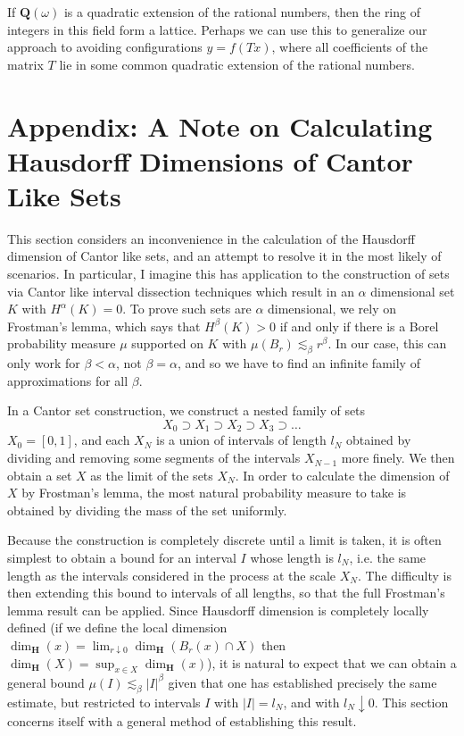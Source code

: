 \documentclass{report}
\theoremstyle{plain}
\theoremstyle{plain}
\begin{document}
If $\mathbf{Q}(\omega)$ is a quadratic extension of the rational numbers, then the ring of integers in this field form a lattice. Perhaps we can use this to generalize our approach to avoiding configurations $y = f(Tx)$, where all coefficients of the matrix $T$ lie in some common quadratic extension of the rational numbers.

\chapter{Appendix: A Note on Calculating Hausdorff Dimensions of Cantor Like Sets}

This section considers an inconvenience in the calculation of the Hausdorff dimension of Cantor like sets, and an attempt to resolve it in the most likely of scenarios. In particular, I imagine this has application to the construction of sets via Cantor like interval dissection techniques which result in an $\alpha$ dimensional set $K$ with $H^\alpha(K) = 0$. To prove such sets are $\alpha$ dimensional, we rely on Frostman's lemma, which says that $H^\beta(K) > 0$ if and only if there is a Borel probability measure $\mu$ supported on $K$ with $\mu(B_r) \lesssim_\beta r^\beta$. In our case, this can only work for $\beta < \alpha$, not $\beta = \alpha$, and so we have to find an infinite family of approximations for all $\beta$.

In a Cantor set construction, we construct a nested family of sets
%
\[ X_0 \supset X_1 \supset X_2 \supset X_3 \supset \dots \]
%
$X_0 = [0,1]$, and each $X_N$ is a union of intervals of length $l_N$ obtained by dividing and removing some segments of the intervals $X_{N-1}$ more finely. We then obtain a set $X$ as the limit of the sets $X_N$. In order to calculate the dimension of $X$ by Frostman's lemma, the most natural probability measure to take is obtained by dividing the mass of the set uniformly.

Because the construction is completely discrete until a limit is taken, it is often simplest to obtain a bound for an interval $I$ whose length is $l_N$, i.e. the same length as the intervals considered in the process at the scale $X_N$. The difficulty is then extending this bound to intervals of all lengths, so that the full Frostman's lemma result can be applied. Since Hausdorff dimension is completely locally defined (if we define the local dimension $\dim_{\mathbf{H}}(x) = \lim_{r \downarrow 0} \dim_{\mathbf{H}}(B_r(x) \cap X)$ then $\dim_{\mathbf{H}}(X) = \sup_{x \in X} \dim_{\mathbf{H}}(x)$), it is natural to expect that we can obtain a general bound $\mu(I) \lesssim_\beta |I|^\beta$ given that one has established precisely the same estimate, but restricted to intervals $I$ with $|I| = l_N$, and with $l_N \downarrow 0$. This section concerns itself with a general method of establishing this result.
\end{document}
